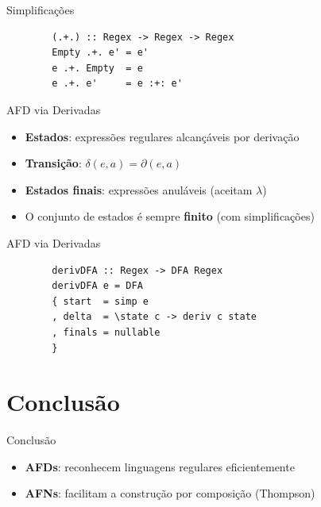 \begin{frame}[fragile]{Simplificações}

    \begin{lstlisting}
        (.+.) :: Regex -> Regex -> Regex
        Empty .+. e' = e'
        e .+. Empty  = e
        e .+. e'     = e :+: e'
    \end{lstlisting}
\end{frame}

\begin{frame}{AFD via Derivadas}

    \begin{itemize}

        \item
        \textbf{Estados}: expressões regulares alcançáveis por derivação
        \item
        \textbf{Transição}: \(\delta(e, a) = \partial(e, a)\)
        \item
        \textbf{Estados finais}: expressões anuláveis (aceitam \(\lambda\))
        \item
        O conjunto de estados é sempre \textbf{finito} (com simplificações)
    \end{itemize}
\end{frame}

\begin{frame}[fragile]{AFD via Derivadas}

    \begin{lstlisting}
        derivDFA :: Regex -> DFA Regex
        derivDFA e = DFA
        { start  = simp e
        , delta  = \state c -> deriv c state
        , finals = nullable
        }
    \end{lstlisting}
\end{frame}


\section{Conclusão}\label{conclusuxe3o}

\begin{frame}{Conclusão}

    \begin{itemize}

        \item
        \textbf{AFDs}: reconhecem linguagens regulares eficientemente
        \item
        \textbf{AFNs}: facilitam a construção por composição (Thompson)
    \end{itemize}
\end{frame}

